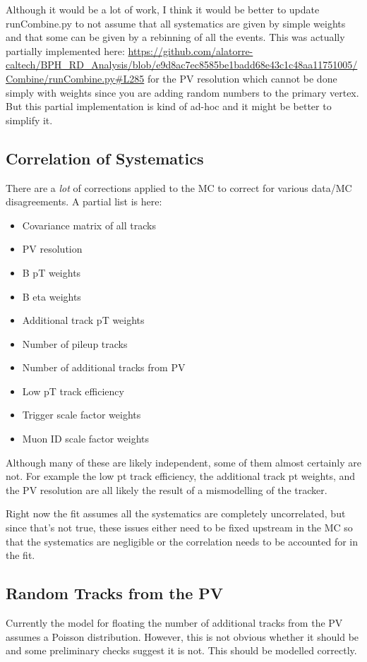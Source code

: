 \documentclass[12pt]{report}
\begin{document}
Although it would be a lot of work, I think it would be better to update
runCombine.py to not assume that all systematics are given by simple weights
and that some can be given by a rebinning of all the events. This was actually
partially implemented here:
\url{https://github.com/alatorre-caltech/BPH_RD_Analysis/blob/e9d8ac7ec8585be1badd68e43c1c48aa11751005/Combine/runCombine.py#L285}
for the PV resolution which cannot be done simply with weights since you are
adding random numbers to the primary vertex. But this partial implementation is
kind of ad-hoc and it might be better to simplify it.
\subsection{Correlation of Systematics}
There are a \emph{lot} of corrections applied to the MC to correct for various
data/MC disagreements. A partial list is here:
\begin{itemize}
\item Covariance matrix of all tracks
\item PV resolution
\item B pT weights
\item B eta weights
\item Additional track pT weights
\item Number of pileup tracks
\item Number of additional tracks from PV
\item Low pT track efficiency
\item Trigger scale factor weights
\item Muon ID scale factor weights
\end{itemize}
Although many of these are likely independent, some of them almost certainly
are not. For example the low pt track efficiency, the additional track pt
weights, and the PV resolution are all likely the result of a mismodelling of
the tracker.

Right now the fit assumes all the systematics are completely uncorrelated, but
since that's not true, these issues either need to be fixed upstream in the MC
so that the systematics are negligible or the correlation needs to be accounted
for in the fit.
\subsection{Random Tracks from the PV}
Currently the model for floating the number of additional tracks from the PV
assumes a Poisson distribution. However, this is not obvious whether it should
be and some preliminary checks suggest it is not. This should be modelled
correctly.
\end{document}
